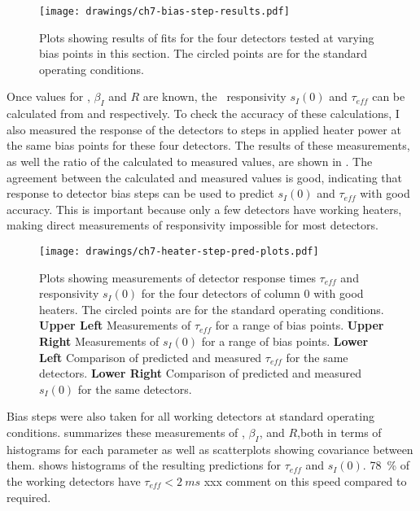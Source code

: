 \begin{figure*}
  \centering
\texttt{[image: drawings/ch7-bias-step-results.pdf]}
\caption{%
  Plots showing results of fits for the four detectors tested at varying bias points in this section.
  The circled points are for the standard operating conditions.
}
\label{fig:ch7-bias-step-results}
\end{figure*}

Once values for \Loop, $\beta_I$ and $R$ are known, the \DC\ responsivity $s_I(0)$ and $\tau_{eff}$ can be calculated from  and  respectively.
To check the accuracy of these calculations, I also measured the response of the detectors to steps in applied heater power at the same bias points for these four detectors.
The results of these measurements, as well the ratio of the calculated to measured values, are shown in .
The agreement between the calculated and measured values is good, indicating that response to detector bias steps can be used to predict $s_I(0)$ and $\tau_{eff}$ with good accuracy.
This is important because only a few detectors have working heaters, making direct measurements of responsivity impossible for most detectors.

\begin{figure*}
  \centering
\texttt{[image: drawings/ch7-heater-step-pred-plots.pdf]}
\caption{%
  Plots showing measurements of detector response times $\tau_{eff}$ and responsivity $s_I(0)$ for the four detectors of column 0 with good heaters.
  The circled points are for the standard operating conditions.
\textbf{Upper Left}
Measurements of $\tau_{eff}$ for a range of bias points.
\textbf{Upper Right}
Measurements of $s_I(0)$ for a range of bias points.
\textbf{Lower Left}
Comparison of predicted and measured $\tau_{eff}$ for the same detectors.
\textbf{Lower Right}
Comparison of predicted and measured $s_I(0)$ for the same detectors.
}
\label{fig:ch7-heater-step-pred-plots}
\end{figure*}

Bias steps were also taken for all working detectors at standard operating conditions.
 summarizes these measurements of \Loop, $\beta_I$, and $R$,both in terms of histograms for each parameter as well as scatterplots showing covariance between them.
 shows histograms of the resulting predictions for $\tau_{eff}$ and $s_I(0)$.
\SI{78}{\percent} of the working detectors have $\tau_{eff} < \SI{2}{ms}$
xxx comment on this speed compared to required.

